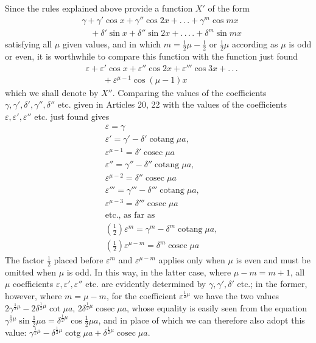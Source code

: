 \begingroup
\renewcommand{\arraystretch}{1.45}
\begingroup
{}
Since the rules explained above provide a function $X'$ of the form
\[
\begin{aligned}
&\gamma+\gamma'\cos x+\gamma''\cos2x+.\,.\,.+\gamma^{m}\cos mx\\[5pt]
&\quad+\delta'\sin x+\delta''\sin2x+.\,.\,.\,.+\delta^{m}\sin mx
\end{aligned}
\]
satisfying all $\mu$ given values, and in which $m=\frac12\mu-\frac12$ or $\frac12\mu$ according as $\mu$ is odd or even, it is worthwhile to compare this function with the function just found
\[
\begin{aligned}
&\varepsilon+\varepsilon'\cos x+\varepsilon''\cos2x+\varepsilon'''\cos3x+.\,.\,.\\[5pt]
&\qquad{}+\varepsilon^{\mu-1}\cos(\mu-1)x
\end{aligned}
\]
\endgroup
{}
which we shall denote by $X''$. Comparing the values of the coefficients
$\gamma,\gamma',\delta',\gamma'',\delta''$ etc. given in Articles 20, 22 with the values of the coefficients
$\varepsilon,\varepsilon',\varepsilon''$ etc. just found gives
\[
\begin{aligned}
&\varepsilon=\gamma\\[5pt]
&\varepsilon'=\gamma'-\delta'\operatorname{cotang}\mu a,
\\[5pt]
&\varepsilon^{\mu-1}=\delta'\operatorname{cosec}\mu a\\[5pt]
&\varepsilon''=\gamma''-\delta''\operatorname{cotang}\mu a,
\\[5pt]
&\varepsilon^{\mu-2}=\delta''\operatorname{cosec}\mu a\\[5pt]
&\varepsilon'''=\gamma'''-\delta'''\operatorname{cotang}\mu a,
\\[5pt]
&\varepsilon^{\mu-3}=\delta'''\operatorname{cosec}\mu a\\[5pt]
&\text{etc., as far as}\\[5pt]
&\left(\tfrac12\right)\varepsilon^m=\gamma^m-\delta^m\operatorname{cotang}\mu a,
\\[5pt]
&\left(\tfrac12\right)\varepsilon^{\mu-m}=\delta^m\operatorname{cosec}\mu a
\end{aligned}
\]
The factor $\tfrac12$ placed before $\varepsilon^m$ and $\varepsilon^{\mu-m}$ applies only when $\mu$ is even and must be omitted when $\mu$ is odd. In this way, in the latter case, where $\mu-m=m+1$, all $\mu$ coefficients $\varepsilon,\varepsilon',\varepsilon''$ etc. are evidently determined by $\gamma,\gamma',\delta'$ etc.; in the former, however, where $m=\mu-m$, for the coefficient $\varepsilon^{\frac12\mu}$ we have the two values $2\gamma^{\frac12\mu}-2\delta^{\frac12\mu}\cot\mu a$, $2\delta^{\frac12\mu}\operatorname{cosec}\mu a$, whose equality is easily seen from the equation $\gamma^{\frac12\mu}\sin\tfrac12\mu a=\delta^{\frac12\mu}\cos\tfrac12\mu a$, and in place of which we can therefore also adopt this value: $\gamma^{\frac12\mu}-\delta^{\frac12\mu}\operatorname{cotg}\mu a+\delta^{\frac12\mu}\operatorname{cosec}\mu a$.

